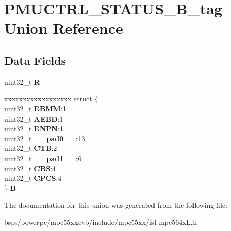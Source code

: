 \hypertarget{unionPMUCTRL__STATUS__32B__tag}{}\section{P\+M\+U\+C\+T\+R\+L\+\_\+\+S\+T\+A\+T\+U\+S\+\_\+B\+\_\+tag Union Reference}
\label{unionPMUCTRL__STATUS__32B__tag}
\subsection*{Data Fields}
\begin{DoxyCompactItemize}
\item 
\mbox{\label{unionPMUCTRL__STATUS__32B__tag_a498933ec1a17eb25c884ac0ca6752c80}} 
uint32\+\_\+t {\bfseries R}
\item 
\mbox{\label{unionPMUCTRL__STATUS__32B__tag_a45461d4dc44de4d733f10ec4a6ed2add}} 
\begin{tabbing}
xx\=xx\=xx\=xx\=xx\=xx\=xx\=xx\=xx\=\kill
struct \{\\
\>uint32\_t {\bfseries EBMM}:1\\
\>uint32\_t {\bfseries AEBD}:1\\
\>uint32\_t {\bfseries ENPN}:1\\
\>uint32\_t {\bfseries \_\_pad0\_\_}:13\\
\>uint32\_t {\bfseries CTB}:2\\
\>uint32\_t {\bfseries \_\_pad1\_\_}:6\\
\>uint32\_t {\bfseries CBS}:4\\
\>uint32\_t {\bfseries CPCS}:4\\
\} {\bfseries B}\\

\end{tabbing}\end{DoxyCompactItemize}


The documentation for this union was generated from the following file\+:\begin{DoxyCompactItemize}
\item 
bsps/powerpc/mpc55xxevb/include/mpc55xx/fsl-\/mpc564x\+L.\+h\end{DoxyCompactItemize}
